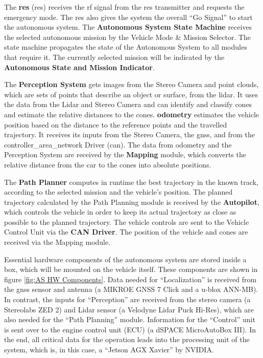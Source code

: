 The \textbf{\acrlong{res}} (\acrshort{res}) receives the \acrshort{rf} signal from the \acrshort{res} transmitter and requests the emergency mode. The \acrshort{res} also gives the system the overall ``Go Signal'' to start the autonomous system. The \textbf{Autonomous System State Machine} receives the selected autonomous mission by the Vehicle Mode \& Mission Selector. The state machine propagates the state of the Autonomous System to all modules that require it. The currently selected mission will be indicated by the \textbf{Autonomous State and Mission Indicator}.

The \textbf{Perception System} gets images from the Stereo Camera and point clouds, which are sets of points that describe an object or surface, from the \Gls{lidar}. It uses the data from the Lidar and Stereo Camera and can identify and classify cones and estimate the relative distances to the cones. \textbf{\Gls{odometry}} estimates the vehicle position based on the distance to the reference points and the travelled trajectory. It receives its inputs from the Stereo Camera, the \acrshort{gnss}, and from the \Gls{controller_area_network} Driver (\acrshort{can}). The data from \Gls{odometry} and the Perception System are received by the \textbf{Mapping} module, which converts the relative distance from the car to the cones into absolute positions.

The \textbf{Path Planner} computes in runtime the best trajectory in the known track, according to the selected mission and the vehicle's position. The planned trajectory calculated by the Path Planning module is received by the \textbf{Autopilot}, which controls the vehicle in order to keep its actual trajectory as close as possible to the planned trajectory. The vehicle controls are sent to the Vehicle Control Unit via the \textbf{CAN Driver}. The position of the vehicle and cones are received via the Mapping module.

Essential hardware components of the autonomous system are stored inside a box, which will be mounted on the vehicle itself. These components are shown in figure \ref{fig:AS HW Components}. Data needed for ``Localization'' is received from the \acrshort{gnss} sensor and antenna (a MIKROE GNSS 7 Click and a u-blox ANN-MB). In contrast, the inputs for ``Perception'' are received from the stereo camera (a Stereolabs ZED 2) and Lidar sensor (a Velodyne Lidar Puck Hi-Res), which are also needed for the ``Path Planning'' module. Information for the ``Control'' unit is sent over to the engine control unit (ECU) (a dSPACE MicroAutoBox III). In the end, all critical data for the operation leads into the processing unit of the system, which is, in this case, a ``Jetson AGX Xavier'' by NVIDIA.


